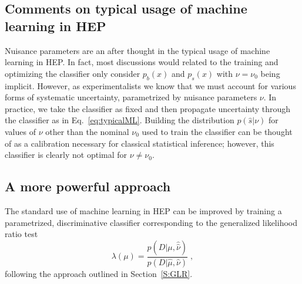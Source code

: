 \documentclass[aoas,preprint]{imsart}
\numberwithin{equation}{section}
\theoremstyle{plain}
\begin{document}
\subsection{Comments on typical usage of machine learning in HEP}

Nuisance parameters are an after thought in the typical usage of machine learning in HEP. In fact, most discussions would related to the training and optimizing the classifier only consider $p_b(x)$ and $p_s(x)$ with $\nu=\nu_0$ being implicit. However, as experimentalists we know that we must account for various forms of systematic uncertainty, parametrized by nuisance parameters $\nu$. In practice, we take the classifier as fixed and then propagate uncertainty through the classifier as in Eq.~\ref{eq:typicalML}. Building the distribution $p(\hat s|\nu)$ for values of $\nu$ other than the nominal $\nu_0$ used to train the classifier can be thought of as a calibration necessary for classical statistical inference; however, this classifier is clearly not optimal for $\nu \ne \nu_0$.

\subsection{A more powerful  approach}

The standard use of machine learning in HEP can be improved by training a parametrized, discriminative classifier corresponding to the generalized likelihood ratio test 
\begin{equation}
\lambda(\mu) = \frac{p(D|\mu, \hat{\hat{\nu}})}{p(D|\hat \mu, {\hat{\nu}})} \;,
\end{equation}
following the approach outlined in Section~\ref{S:GLR}. 
\end{document}
